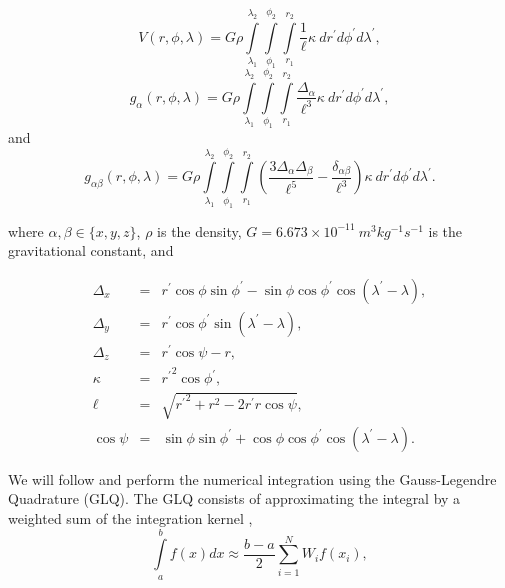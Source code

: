 \documentclass[paper,twocolumn]{geophysics}
\begin{document}
\begin{equation}
    V(r,\phi,\lambda) = G \rho
        \int\limits_{\lambda_1}^{\lambda_2}
        \int\limits_{\phi_1}^{\phi_2}
        \int\limits_{r_1}^{r_2}
        \frac{1}{\ell}
        \kappa\  dr^\prime d\phi^\prime d\lambda^\prime,
    \label{eq:tesspot}
\end{equation}
\begin{equation}
    g_{\alpha}(r,\phi,\lambda) = G \rho
        \int\limits_{\lambda_1}^{\lambda_2}
        \int\limits_{\phi_1}^{\phi_2}
        \int\limits_{r_1}^{r_2}
        \frac{\Delta_\alpha}{\ell^3}
        \kappa\ dr^\prime d\phi^\prime d\lambda^\prime,
    \label{eq:tessgrav}
\end{equation}
\noindent
and
\begin{equation}
    g_{\alpha\beta}(r,\phi,\lambda) = G \rho
        \int\limits_{\lambda_1}^{\lambda_2}
        \int\limits_{\phi_1}^{\phi_2}
        \int\limits_{r_1}^{r_2}
        \left(
            \frac{3\Delta_{\alpha} \Delta_{\beta}}{\ell^5} -
            \frac{\delta_{\alpha\beta}}{\ell^3}
        \right)
        \kappa\ dr^\prime d\phi^\prime d\lambda^\prime.
    \label{eq:tesstensor}
\end{equation}

\noindent
where $\alpha, \beta \in \{x, y, z\}$,
$\rho$ is the density,
$G = 6.673\times10^{-11}\ m^3kg^{-1}s^{-1}$ is the gravitational constant,
and

\begin{eqnarray}
    \Delta_x &=& r^\prime\cos\phi\sin\phi^\prime - \sin\phi\cos\phi^\prime
                 \cos(\lambda^\prime - \lambda), \\
    \Delta_y &=& r^\prime \cos \phi^\prime \sin(\lambda^\prime - \lambda), \\
    \Delta_z &=& r^\prime \cos \psi - r,\\
    \kappa &=& {r^\prime}^2 \cos \phi^\prime, \\
    \ell &=& \sqrt{{r^\prime}^2 + r^2 - 2 r^\prime r \cos \psi}, \\
    \cos\psi &=& \sin\phi\sin\phi^\prime + \cos\phi\cos\phi^\prime
                 \cos(\lambda^\prime - \lambda).
\end{eqnarray}

We will follow \citet{Asgharzadeh2007} and perform the numerical integration
using the Gauss-Legendre Quadrature (GLQ).
The GLQ consists of approximating the integral by a weighted sum of the
integration kernel \citep{Hildebrand1987},
\begin{equation}
    \int\limits_a^b f(x) dx \approx
    \frac{b-a}{2}\sum\limits_{i=1}^N W_i f(x_i),
    \label{eq:glq1d}
\end{equation}
\end{document}
